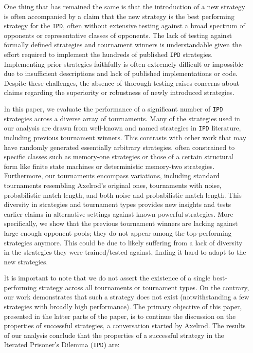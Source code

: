 \documentclass{article}
\def\IPD{\texttt{IPD}}
\begin{document}
One thing that has remained the same is that the introduction of a new strategy
is often accompanied by a claim that the new strategy is the best performing
strategy for the \IPD, often without extensive testing against a broad spectrum
of opponents or representative classes of opponents. The lack of testing against
formally defined strategies and tournament winners is understandable given the
effort required to implement the hundreds of published \IPD{} strategies.
Implementing prior strategies faithfully is often extremely difficult or
impossible due to insufficient descriptions and lack of published
implementations or code. Despite these challenges, the absence of thorough
testing raises concerns about claims regarding the superiority or robustness of
newly introduced strategies.

In this paper, we evaluate the performance of a significant number of \IPD{}
strategies across a diverse array of tournaments. Many of the strategies used in
our analysis are drawn from well-known and named strategies in \IPD{}
literature, including previous tournament winners. This contrasts with other
work that may have randomly generated essentially arbitrary strategies, often
constrained to specific classes such as memory-one strategies or those of a
certain structural form like finite state machines or deterministic memory-two
strategies. Furthermore, our tournaments encompass variations, including standard
tournaments resembling Axelrod's original ones, tournaments with noise,
probabilistic match length, and both noise and probabilistic match length. This
diversity in strategies and tournament types provides new insights and tests
earlier claims in alternative settings against known powerful strategies.
More specifically, we show that the previous tournament
winners are lacking against large enough opponent pools; they do not appear
among the top-performing strategies anymore. This could be due to likely
suffering from a lack of diversity in the strategies they were trained/tested
against, finding it hard to adapt to the new strategies.

It is important to note that we do not assert the existence of a single
best-performing strategy across all tournaments or tournament types. On the
contrary, our work demonstrates that such a strategy does not exist
(notwithstanding a few strategies with broadly high performance). The primary
objective of this paper, presented in the latter parts of the paper, is to
continue the discussion on the properties of successful strategies, a
conversation started by Axelrod. 
The results of our analysis conclude that the properties of a successful
strategy in the Iterated Prisoner's Dilemma (\IPD{}) are:
\end{document}
